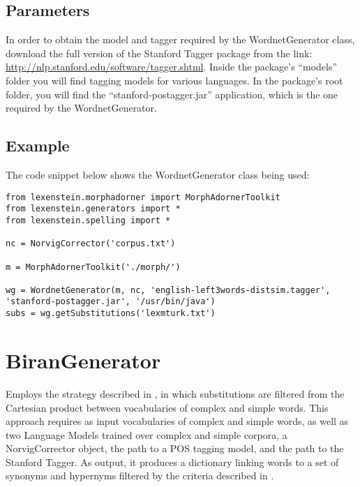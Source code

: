 \subsection{Parameters}

In order to obtain the model and tagger required by the WordnetGenerator class, download the full version of the Stanford Tagger package from the link: \url{http://nlp.stanford.edu/software/tagger.shtml}. Inside the package's ``models'' folder you will find tagging models for various languages. In the package's root folder, you will find the ``stanford-postagger.jar'' application, which is the one required by the WordnetGenerator.

\subsection{Example}

The code snippet below shows the WordnetGenerator class being used:

\begin{lstlisting}
from lexenstein.morphadorner import MorphAdornerToolkit
from lexenstein.generators import *
from lexenstein.spelling import *

nc = NorvigCorrector('corpus.txt')

m = MorphAdornerToolkit('./morph/')

wg = WordnetGenerator(m, nc, 'english-left3words-distsim.tagger', 'stanford-postagger.jar', '/usr/bin/java')
subs = wg.getSubstitutions('lexmturk.txt')
\end{lstlisting}









\section{BiranGenerator}

Employs the strategy described in \cite{Biran2011}, in which substitutions are filtered from the Cartesian product between vocabularies of complex and simple words. This approach requires as input vocabularies of complex and simple words, as well as two Language Models trained over complex and simple corpora, a NorvigCorrector object, the path to a POS tagging model, and the path to the Stanford Tagger. As output, it produces a dictionary linking words to a set of synonyms and hypernyms filtered by the criteria described in \cite{Biran2011}.

